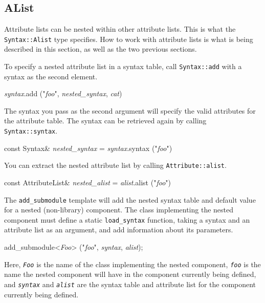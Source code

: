 \documentclass{article}
\newcommand{\code}[1]{\texttt{#1}}
\begin{document}
\subsection{AList}

Attribute lists can be nested within other attribute lists.  This is
what the \code{Syntax::Alist} type specifies.  How to work with
attribute lists is what is being described in this section, as well as
the two previous sections.  

To specify a nested attribute list in a syntax table, call
\code{Syntax::add} with a syntax as the second element.
\begin{center}
  \begin{tt}
    \textit{syntax}.add ("\textit{foo}", 
                         \textit{nested\_syntax}, \textit{cat})
  \end{tt}
\end{center}
The syntax you pass as the second argument will specify the valid
attributes for the attribute table.  The syntax can be retrieved again
by calling \code{Syntax::syntax}.
\begin{center}
  \begin{tt}
    const Syntax\& \textit{nested\_syntax}
      = \textit{syntax}.syntax ("\textit{foo}")
  \end{tt}
\end{center}

You can extract the nested attribute list by calling
\code{Attribute::alist}.
\begin{center}
  \begin{tt}
    const AttributeList\& \textit{nested\_alist} 
      = \textit{alist}.alist ("\textit{foo}")
  \end{tt}
\end{center}

The \code{add\_submodule} template will add the nested syntax table
and default value for a nested (non-library) component.  The class
implementing the nested component must define a static
\code{load\_syntax} function, taking a syntax and an attribute list as
an argument, and add information about its parameters.
\begin{center}
  \begin{tt}
    add\_submodule<\textit{Foo}> ("\textit{foo}",
                                 \textit{syntax}, \textit{alist});
  \end{tt}
\end{center}
Here, \texttt{\textit{Foo}} is the name of the class implementing the
nested component, \texttt{\textit{foo}} is the name the nested
component will have in the component currently being defined, and
\texttt{\textit{syntax}} and \texttt{\textit{alist}} are the syntax
table and attribute list for the component currently being defined. 
\end{document}
